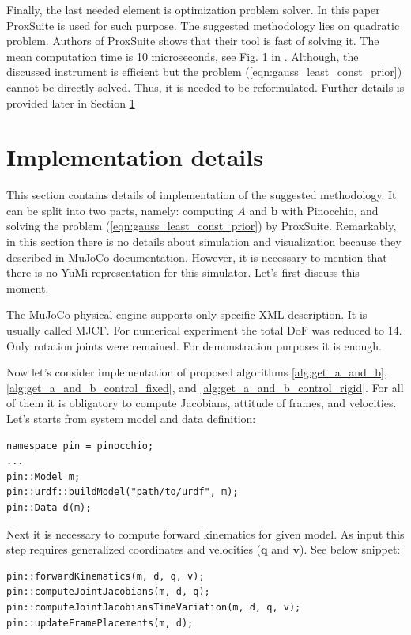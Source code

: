 Finally, the last needed element is optimization problem solver. In this paper 
ProxSuite \cite{ProxQP} is used for such purpose. The suggested methodology lies 
on quadratic problem. Authors of ProxSuite shows that their tool is fast of 
solving it. The mean computation time is 10 microseconds, see Fig. 1 in 
\cite{ProxQP}. Although, the discussed instrument is efficient but the problem 
(\ref{eqn:gauss_least_const_prior}) cannot be directly solved. Thus, it is needed 
to be reformulated. Further details is provided later in Section \ref{sec:impl_details}

\section{Implementation details}
\label{sec:impl_details}

This section contains details of implementation of the suggested methodology. It 
can be split into two parts, namely: computing $A$ and $\mathbf{b}$ with Pinocchio, 
and solving the problem (\ref{eqn:gauss_least_const_prior}) by ProxSuite. 
Remarkably, in this section there is no details about simulation and visualization 
because they described in MuJoCo documentation. However, it is necessary to 
mention that there is no YuMi representation for this simulator. Let's 
first discuss this moment.

The MuJoCo physical engine supports only specific XML description. It is usually 
called MJCF. For numerical experiment the total DoF was reduced to 14. Only rotation 
joints were remained. For demonstration purposes it is enough.

Now let's consider implementation of proposed algorithms 
\ref{alg:get_a_and_b}, \ref{alg:get_a_and_b_control_fixed}, and 
\ref{alg:get_a_and_b_control_rigid}. For all of them it is obligatory to compute 
Jacobians, attitude of frames, and velocities. Let's starts from system model 
and data definition:

\begin{lstlisting}[caption={Model and data}, label=snp:model_and_data]
namespace pin = pinocchio;
...
pin::Model m;
pin::urdf::buildModel("path/to/urdf", m);
pin::Data d(m);
\end{lstlisting}

Next it is necessary to compute forward kinematics for given model. As input this 
step requires generalized coordinates and velocities ($\mathbf{q}$ and 
$\mathbf{v}$). See below snippet:

\begin{lstlisting}[caption={Forward kinematics}, label=snp:forward_kin]
pin::forwardKinematics(m, d, q, v);
pin::computeJointJacobians(m, d, q);
pin::computeJointJacobiansTimeVariation(m, d, q, v);
pin::updateFramePlacements(m, d);
\end{lstlisting}

